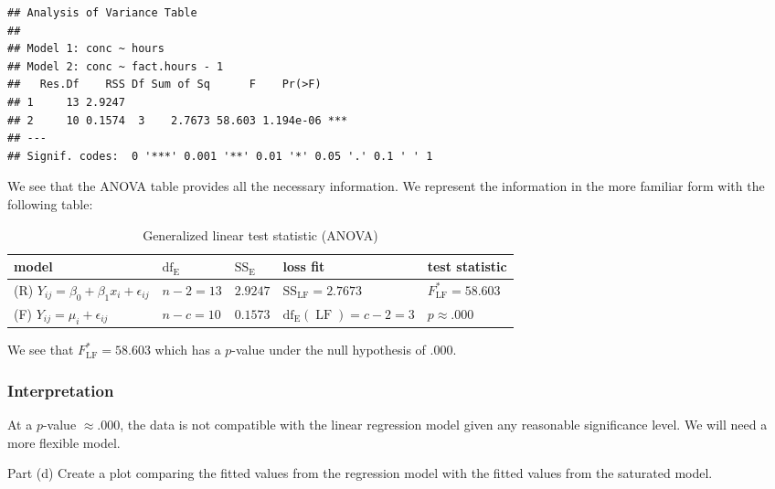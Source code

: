 \documentclass[
]{article}
\begin{document}
\begin{verbatim}
## Analysis of Variance Table
## 
## Model 1: conc ~ hours
## Model 2: conc ~ fact.hours - 1
##   Res.Df    RSS Df Sum of Sq      F    Pr(>F)    
## 1     13 2.9247                                  
## 2     10 0.1574  3    2.7673 58.603 1.194e-06 ***
## ---
## Signif. codes:  0 '***' 0.001 '**' 0.01 '*' 0.05 '.' 0.1 ' ' 1
\end{verbatim}

We see that the ANOVA table provides all the necessary information. We
represent the information in the more familiar form with the following
table:

\begin{table}[ht]
\caption{Generalized linear test statistic (ANOVA)}
\centering
\begin{tabular}{|l|l|l||l|l|}
\hline
model                                                      & $\operatorname{df_E}$   & $\operatorname{SS_E}$   & loss fit            & \textbf{test statistic}\\
\hline
\hline
(R) $Y_{i j} = \beta_0 + \beta_1 x_i + \epsilon_{i j}$ & $n-2=13$ & $2.9247$ & $\operatorname{SS_{LF}}= 2.7673$                    & $F_{\operatorname{LF}}^*=58.603$\\
(F) $Y_{i j} = \mu_i + \epsilon_{i j}$                 & $n-c=10$ & $0.1573$ & $\operatorname{df_E}(\operatorname{LF}) = c-2 = 3$ & $p \approx .000$\\
\hline
\end{tabular}
\end{table}

We see that \(F_{\operatorname{LF}}^*=58.603\) which has a \(p\)-value
under the null hypothesis of \(.000\).

\hypertarget{interpretation}{%
\subsubsection{Interpretation}\label{interpretation}}

At a \(p\)-value \(\approx .000\), the data is not compatible with the
linear regression model given any reasonable significance level. We will
need a more flexible model.

\begin{tcolorbox}[split=\f]
Part (d)
\tcblower
Create a plot comparing the fitted values from the regression model with the
fitted values from the saturated model.
\end{tcolorbox}
\end{document}

